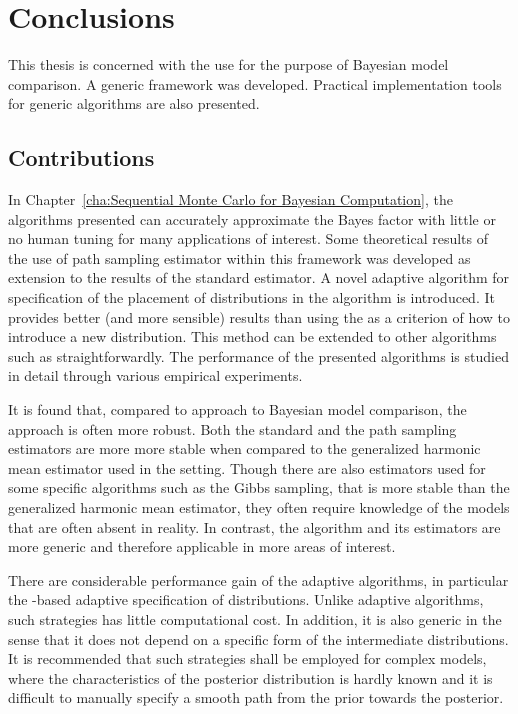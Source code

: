 \chapter{Conclusions}
\label{cha:Conclusions}

This thesis is concerned with the use \smc for the purpose of Bayesian model
comparison. A generic framework was developed. Practical implementation tools
for generic \smc algorithms are also presented.

\section{Contributions}
\label{sec:Contributions}


In Chapter~\ref{cha:Sequential Monte Carlo for Bayesian Computation}, the
algorithms presented can accurately approximate the Bayes factor with little
or no human tuning for many applications of interest. Some theoretical results
of the use of path sampling estimator within this framework was developed as
extension to the results of the standard estimator. A novel adaptive algorithm
for specification of the placement of distributions in the \smc[2] algorithm
is introduced. It provides better (and more sensible) results than using the
\ess as a criterion of how to introduce a new distribution. This method can be
extended to other algorithms such as \smc[3] straightforwardly. The
performance of the presented algorithms is studied in detail through various
empirical experiments.

It is found that, compared to \mcmc approach to Bayesian model comparison, the
\smc approach is often more robust. Both the standard and the path sampling
estimators are more more stable when compared to the generalized harmonic mean
estimator used in the \mcmc setting. Though there are also estimators used for
some specific \mcmc algorithms such as the Gibbs sampling, that is more stable
than the generalized harmonic mean estimator, they often require knowledge of
the models that are often absent in reality. In contrast, the \smc algorithm
and its estimators are more generic and therefore applicable in more areas of
interest.

There are considerable performance gain of the adaptive \smc algorithms, in
particular the \cess-based adaptive specification of distributions. Unlike
adaptive \mcmc algorithms, such strategies has little computational cost. In
addition, it is also generic in the sense that it does not depend on a
specific form of the intermediate distributions. It is recommended that such
strategies shall be employed for complex models, where the characteristics of
the posterior distribution is hardly known and it is difficult to manually
specify a smooth path from the prior towards the posterior.

